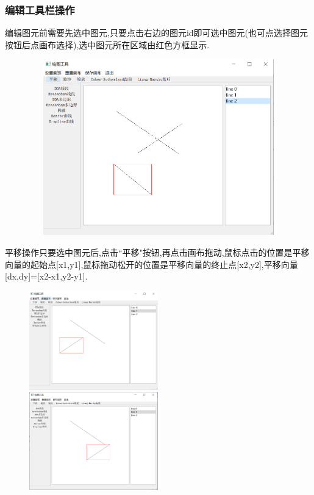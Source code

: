\documentclass[a4paper,UTF8]{article}
\theoremstyle{definition}
\begin{document}
\subsubsection{编辑工具栏操作}
编辑图元前需要先选中图元,只要点击右边的图元id即可选中图元(也可点选择图元按钮后点画布选择),选中图元所在区域由红色方框显示.
\begin{figure}[H]
	\includegraphics[width=5in,height=3in]{choose.png}
\end{figure}
平移操作只要选中图元后,点击``平移"按钮,再点击画布拖动,鼠标点击的位置是平移向量的起始点[x1,y1],鼠标拖动松开的位置是平移向量的终止点[x2,y2],平移向量[dx,dy]=[x2-x1,y2-y1].
\begin{figure}[H]
	\centering
	\begin{minipage}[t]{0.5\linewidth}
		\includegraphics[width=2.2in]{translate1.png}
	\end{minipage}%
	\begin{minipage}[t]{0.5\linewidth}
		\includegraphics[width=2.2in]{translate2.png}
	\end{minipage}
\end{figure}
\end{document}
